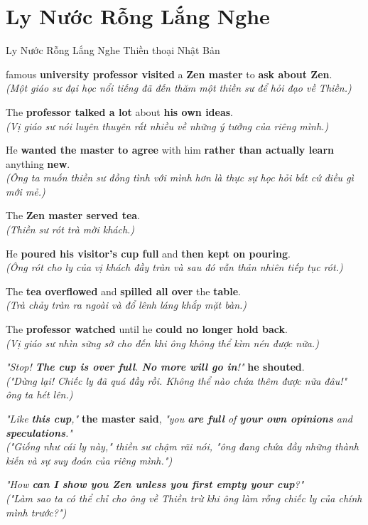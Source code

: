 \section{Ly Nước Rỗng Lắng Nghe}
\begin{truyen}{Ly Nước Rỗng Lắng Nghe}%
              {Thiền thoại Nhật Bản}

famous \textbf{university professor visited} a \textbf{Zen master} to \textbf{ask about Zen}.\\
\textit{(Một giáo sư đại học nổi tiếng đã đến thăm một thiền sư để hỏi đạo về Thiền.)}

The \textbf{professor talked a lot} about \textbf{his own ideas}.\\
\textit{(Vị giáo sư nói luyên thuyên rất nhiều về những ý tưởng của riêng mình.)}

He \textbf{wanted the master to agree} with him \textbf{rather than actually learn} anything \textbf{new}.\\
\textit{(Ông ta muốn thiền sư đồng tình với mình hơn là thực sự học hỏi bất cứ điều gì mới mẻ.)}

The \textbf{Zen master served tea}.\\
\textit{(Thiền sư rót trà mời khách.)}

He \textbf{poured his visitor's cup full} and \textbf{then kept on pouring}.\\
\textit{(Ông rót cho ly của vị khách đầy tràn và sau đó vẫn thản nhiên tiếp tục rót.)}

The \textbf{tea overflowed} and \textbf{spilled all over} the \textbf{table}.\\
\textit{(Trà chảy tràn ra ngoài và đổ lênh láng khắp mặt bàn.)}

The \textbf{professor watched} until he \textbf{could no longer hold back}.\\
\textit{(Vị giáo sư nhìn sững sờ cho đến khi ông không thể kìm nén được nữa.)}

\textit{"Stop! \textbf{The cup is over full}. \textbf{No more will go in}!"} \textbf{he shouted}.\\
\textit{("Dừng lại! Chiếc ly đã quá đầy rồi. Không thể nào chứa thêm được nữa đâu!" ông ta hét lên.)}

\textit{"Like \textbf{this cup},"} \textbf{the master said}, \textit{"you \textbf{are full} of \textbf{your own opinions} and \textbf{speculations}."}\\
\textit{("Giống như cái ly này," thiền sư chậm rãi nói, "ông đang chứa đầy những thành kiến và sự suy đoán của riêng mình.")}

\textit{"How \textbf{can I show you Zen unless you first empty your cup}?"}\\
\textit{("Làm sao ta có thể chỉ cho ông về Thiền trừ khi ông làm rỗng chiếc ly của chính mình trước?")}
\end{truyen}

